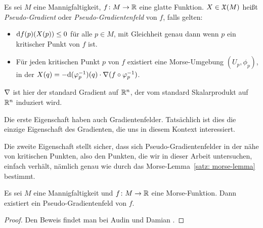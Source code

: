 \begin{definition}
    \label{def: pseudo-gradient}
    Es sei $M$ eine Mannigfaltigkeit, $f \colon M \to { \mathbb R }$ eine glatte Funktion. $X \in { \mathfrak{X} } (M)$
    heißt \textit{Pseudo-Gradient} oder \textit{Pseudo-Gradientenfeld} von $f$, falls gelten:
    \begin{itemize}
        \item ${ \operatorname{d} } f (p) (X(p)) \leq 0$ für alle $p \in M$, mit Gleichheit genau dann wenn 
            $p$ ein kritischer Punkt von $f$ ist.
        \item Für jeden kritischen Punkt $p$ von $f$ existiert eine Morse-Umgebung 
            $(U_p, \phi_p)$, in der $X (q) = 
                - { \operatorname{d} } (\varphi_p^{-1}) (q) \cdot { \nabla } (f \circ \varphi_p^{-1})$.
    \end{itemize}
    ${ \nabla }$ ist hier der standard Gradient auf ${ \mathbb R }^n$, der vom standard Skalarprodukt auf ${ \mathbb R }^n$ 
    induziert wird.
\end{definition}

Die erste Eigenschaft haben auch Gradientenfelder. Tatsächlich ist dies die einzige
Eigenschaft des Gradienten, die uns in diesem Kontext interessiert.

Die zweite Eigenschaft stellt sicher, dass sich Pseudo-Gradientenfelder in der nähe von 
kritischen Punkten, also den Punkten, die wir in dieser Arbeit untersuchen, einfach verhält, 
nämlich genau wie durch das Morse-Lemma~\ref{satz: morse-lemma} bestimmt.

\begin{prop}
    Es sei $M$ eine Mannigfaltigkeit und $f \colon M \to { \mathbb R }$ eine Morse-Funktion. 
    Dann existiert ein Pseudo-Gradientenfeld von $f$.
\end{prop}

\begin{proof}
    Den Beweis findet man bei Audin und Damian \cite{audin}.
\end{proof}